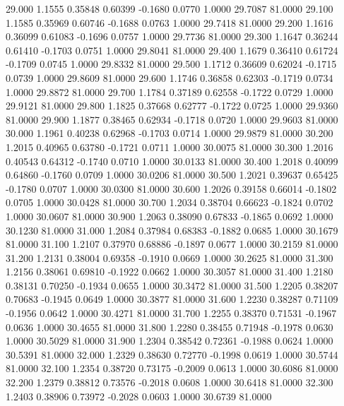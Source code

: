   29.000   1.1555   0.35848   0.60399  -0.1680   0.0770   1.0000  29.7087  81.0000
  29.100   1.1585   0.35969   0.60746  -0.1688   0.0763   1.0000  29.7418  81.0000
  29.200   1.1616   0.36099   0.61083  -0.1696   0.0757   1.0000  29.7736  81.0000
  29.300   1.1647   0.36244   0.61410  -0.1703   0.0751   1.0000  29.8041  81.0000
  29.400   1.1679   0.36410   0.61724  -0.1709   0.0745   1.0000  29.8332  81.0000
  29.500   1.1712   0.36609   0.62024  -0.1715   0.0739   1.0000  29.8609  81.0000
  29.600   1.1746   0.36858   0.62303  -0.1719   0.0734   1.0000  29.8872  81.0000
  29.700   1.1784   0.37189   0.62558  -0.1722   0.0729   1.0000  29.9121  81.0000
  29.800   1.1825   0.37668   0.62777  -0.1722   0.0725   1.0000  29.9360  81.0000
  29.900   1.1877   0.38465   0.62934  -0.1718   0.0720   1.0000  29.9603  81.0000
  30.000   1.1961   0.40238   0.62968  -0.1703   0.0714   1.0000  29.9879  81.0000
  30.200   1.2015   0.40965   0.63780  -0.1721   0.0711   1.0000  30.0075  81.0000
  30.300   1.2016   0.40543   0.64312  -0.1740   0.0710   1.0000  30.0133  81.0000
  30.400   1.2018   0.40099   0.64860  -0.1760   0.0709   1.0000  30.0206  81.0000
  30.500   1.2021   0.39637   0.65425  -0.1780   0.0707   1.0000  30.0300  81.0000
  30.600   1.2026   0.39158   0.66014  -0.1802   0.0705   1.0000  30.0428  81.0000
  30.700   1.2034   0.38704   0.66623  -0.1824   0.0702   1.0000  30.0607  81.0000
  30.900   1.2063   0.38090   0.67833  -0.1865   0.0692   1.0000  30.1230  81.0000
  31.000   1.2084   0.37984   0.68383  -0.1882   0.0685   1.0000  30.1679  81.0000
  31.100   1.2107   0.37970   0.68886  -0.1897   0.0677   1.0000  30.2159  81.0000
  31.200   1.2131   0.38004   0.69358  -0.1910   0.0669   1.0000  30.2625  81.0000
  31.300   1.2156   0.38061   0.69810  -0.1922   0.0662   1.0000  30.3057  81.0000
  31.400   1.2180   0.38131   0.70250  -0.1934   0.0655   1.0000  30.3472  81.0000
  31.500   1.2205   0.38207   0.70683  -0.1945   0.0649   1.0000  30.3877  81.0000
  31.600   1.2230   0.38287   0.71109  -0.1956   0.0642   1.0000  30.4271  81.0000
  31.700   1.2255   0.38370   0.71531  -0.1967   0.0636   1.0000  30.4655  81.0000
  31.800   1.2280   0.38455   0.71948  -0.1978   0.0630   1.0000  30.5029  81.0000
  31.900   1.2304   0.38542   0.72361  -0.1988   0.0624   1.0000  30.5391  81.0000
  32.000   1.2329   0.38630   0.72770  -0.1998   0.0619   1.0000  30.5744  81.0000
  32.100   1.2354   0.38720   0.73175  -0.2009   0.0613   1.0000  30.6086  81.0000
  32.200   1.2379   0.38812   0.73576  -0.2018   0.0608   1.0000  30.6418  81.0000
  32.300   1.2403   0.38906   0.73972  -0.2028   0.0603   1.0000  30.6739  81.0000
